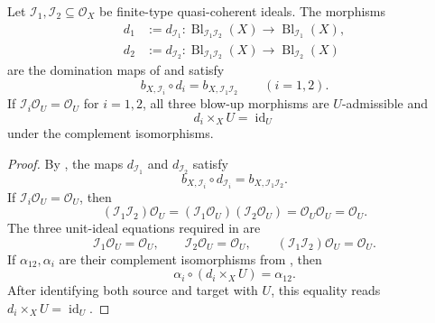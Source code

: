 \begin{lemma}
  \label{lemma:nagata-product-ideal-common-blowup}

  Let $\mathcal I_1,\mathcal I_2\subseteq\mathcal O_X$ be finite-type
  quasi-coherent ideals.  The morphisms
  \[
  \begin{aligned}
    d_1&:=d_{\mathcal I_1}\colon
      \operatorname{Bl}_{\mathcal I_1\mathcal I_2}(X)
        \longrightarrow\operatorname{Bl}_{\mathcal I_1}(X),\\
    d_2&:=d_{\mathcal I_2}\colon
      \operatorname{Bl}_{\mathcal I_1\mathcal I_2}(X)
        \longrightarrow\operatorname{Bl}_{\mathcal I_2}(X)
  \end{aligned}
  \]
  are the domination maps of
   and satisfy
  \[
    b_{X,\mathcal I_i}\circ d_i=b_{X,\mathcal I_1\mathcal I_2}
      \qquad(i=1,2).
  \]
  If $\mathcal I_i\mathcal O_U=\mathcal O_U$ for $i=1,2$, all three
  blow-up morphisms are $U$-admissible and
  \[
    d_i\times_XU=\operatorname{id}_U
  \]
  under the complement isomorphisms.
\end{lemma}

\begin{proof}
  By , the maps
  $d_{\mathcal I_1}$ and $d_{\mathcal I_2}$ satisfy
  \[
    b_{X,\mathcal I_i}\circ d_{\mathcal I_i}
      =b_{X,\mathcal I_1\mathcal I_2}.
  \]
  If $\mathcal I_i\mathcal O_U=\mathcal O_U$, then
  \[
    (\mathcal I_1\mathcal I_2)\mathcal O_U
      =(\mathcal I_1\mathcal O_U)(\mathcal I_2\mathcal O_U)
      =\mathcal O_U\mathcal O_U=\mathcal O_U.
  \]
  The three unit-ideal equations required in
   are
  \[
    \mathcal I_1\mathcal O_U=\mathcal O_U,\qquad
    \mathcal I_2\mathcal O_U=\mathcal O_U,\qquad
    (\mathcal I_1\mathcal I_2)\mathcal O_U=\mathcal O_U.
  \]
  If
  $\alpha_{12},\alpha_i$ are their complement isomorphisms from
  , then
  \[
    \alpha_i\circ(d_i\times_XU)
      =\alpha_{12}.
  \]
  After identifying both source and target with $U$, this equality reads
  $d_i\times_XU=\operatorname{id}_U$.
\end{proof}

